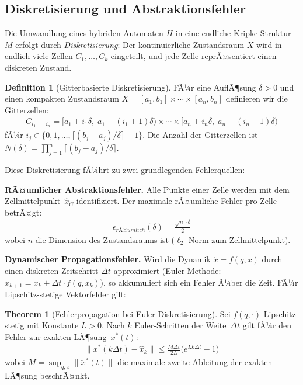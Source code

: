 ﻿\documentclass[a4paper,12pt]{article}
\theoremstyle{definition}
\newtheorem{definition}{Definition}[section]
\newtheorem{theorem}{Theorem}[section]
\begin{document}
\subsection{Diskretisierung und Abstraktionsfehler}

Die Umwandlung eines hybriden Automaten $H$ in eine endliche Kripke-Struktur $M$ erfolgt durch \emph{Diskretisierung}: Der kontinuierliche Zustandsraum $X$ wird in endlich viele Zellen $C_1, \ldots, C_k$ eingeteilt, und jede Zelle reprÃ¤sentiert einen diskreten Zustand.

\begin{definition}[Gitterbasierte Diskretisierung]
FÃ¼r eine AuflÃ¶sung $\delta > 0$ und einen kompakten Zustandsraum $X = [a_1, b_1] \times \cdots \times [a_n, b_n]$ definieren wir die Gitterzellen:
\begin{align}
  C_{i_1, \ldots, i_n} = \bigl[a_1 + i_1 \delta,\; a_1 + (i_1+1)\delta\bigr) \times \cdots \times \bigl[a_n + i_n \delta,\; a_n + (i_n+1)\delta\bigr)
\end{align}
fÃ¼r $i_j \in \{0, 1, \ldots, \lceil(b_j - a_j)/\delta\rceil - 1\}$. Die Anzahl der Gitterzellen ist $N(\delta) = \prod_{j=1}^n \lceil(b_j - a_j)/\delta\rceil$.
\end{definition}

Diese Diskretisierung fÃ¼hrt zu zwei grundlegenden Fehlerquellen:

\textbf{RÃ¤umlicher Abstraktionsfehler.} Alle Punkte einer Zelle werden mit dem Zellmittelpunkt~$\hat{x}_{C}$ identifiziert. Der maximale rÃ¤umliche Fehler pro Zelle betrÃ¤gt:
\begin{align}
  \epsilon_{\mathit{rÃ¤umlich}}(\delta) = \frac{\sqrt{n} \cdot \delta}{2}
\end{align}
wobei $n$ die Dimension des Zustandsraums ist ($\ell_2$-Norm zum Zellmittelpunkt).

\textbf{Dynamischer Propagationsfehler.} Wird die Dynamik $\dot{x} = f(q, x)$ durch einen diskreten Zeitschritt $\Delta t$ approximiert (Euler-Methode: $x_{k+1} = x_k + \Delta t \cdot f(q, x_k)$), so akkumuliert sich ein Fehler Ã¼ber die Zeit. FÃ¼r Lipschitz-stetige Vektorfelder gilt:

\begin{theorem}[Fehlerpropagation bei Euler-Diskretisierung]
Sei $f(q,\cdot)$ Lipschitz-stetig mit Konstante $L>0$. Nach $k$ Euler-Schritten der Weite~$\Delta t$ gilt fÃ¼r den Fehler zur exakten LÃ¶sung~$x^*(t)$:
\begin{align}
  \|x^*(k\Delta t) - \hat{x}_k\| \leq \frac{M \Delta t}{2L} \bigl(e^{Lk\Delta t} - 1\bigr)
\end{align}
wobei $M = \sup_{q,x} \|\ddot{x}^*(t)\|$ die maximale zweite Ableitung der exakten LÃ¶sung beschrÃ¤nkt.
\end{theorem}
\end{document}

